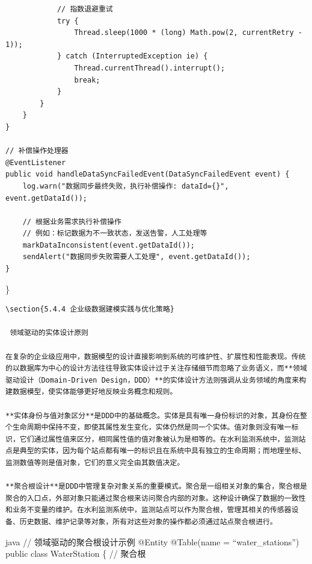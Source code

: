 \begin{verbatim}
            // 指数退避重试
            try {
                Thread.sleep(1000 * (long) Math.pow(2, currentRetry - 1));
            } catch (InterruptedException ie) {
                Thread.currentThread().interrupt();
                break;
            }
        }
    }
}

// 补偿操作处理器
@EventListener
public void handleDataSyncFailedEvent(DataSyncFailedEvent event) {
    log.warn("数据同步最终失败，执行补偿操作: dataId={}", event.getDataId());
    
    // 根据业务需求执行补偿操作
    // 例如：标记数据为不一致状态，发送告警，人工处理等
    markDataInconsistent(event.getDataId());
    sendAlert("数据同步失败需要人工处理", event.getDataId());
}
\end{verbatim}

\}

\begin{lstlisting}
\section{5.4.4 企业级数据建模实践与优化策略}

 领域驱动的实体设计原则

在复杂的企业级应用中，数据模型的设计直接影响到系统的可维护性、扩展性和性能表现。传统的以数据库为中心的设计方法往往导致实体设计过于关注存储细节而忽略了业务语义，而**领域驱动设计（Domain-Driven Design，DDD）**的实体设计方法则强调从业务领域的角度来构建数据模型，使实体能够更好地反映业务概念和规则。

**实体身份与值对象区分**是DDD中的基础概念。实体是具有唯一身份标识的对象，其身份在整个生命周期中保持不变，即使其属性发生变化，实体仍然是同一个实体。值对象则没有唯一标识，它们通过属性值来区分，相同属性值的值对象被认为是相等的。在水利监测系统中，监测站点是典型的实体，因为每个站点都有唯一的标识且在系统中具有独立的生命周期；而地理坐标、监测数值等则是值对象，它们的意义完全由其数值决定。

**聚合根设计**是DDD中管理复杂对象关系的重要模式。聚合是一组相关对象的集合，聚合根是聚合的入口点，外部对象只能通过聚合根来访问聚合内部的对象。这种设计确保了数据的一致性和业务不变量的维护。在水利监测系统中，监测站点可以作为聚合根，管理其相关的传感器设备、历史数据、维护记录等对象，所有对这些对象的操作都必须通过站点聚合根进行。
\end{lstlisting}

java // 领域驱动的聚合根设计示例 @Entity @Table(name = ``water\_stations'') public class WaterStation \{ // 聚合根


